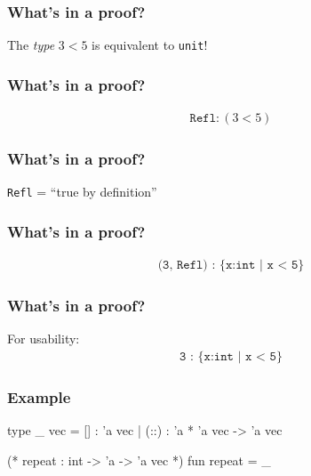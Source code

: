 \documentclass[usenames,dvipsnames]{beamer}
\begin{document}

\begin{frame}
  \frametitle{What's in a proof?}

  The \emph{type} $3<5$ is equivalent to \texttt{unit}!
\end{frame}


\begin{frame}
  \frametitle{What's in a proof?}

  \begin{align*}
    \texttt{Refl}:(3<5)
  \end{align*}
\end{frame}


\begin{frame}
  \frametitle{What's in a proof?}

  \texttt{Refl} = ``true by definition''
\end{frame}


\begin{frame}
  \frametitle{What's in a proof?}

  \phantom{For usability:}
  \begin{align*}
    \texttt{(3, Refl) : \{x:int | x < 5\}}
  \end{align*}
\end{frame}


\begin{frame}
  \frametitle{What's in a proof?}

  For usability:
  \begin{align*}
    \texttt{3 : \{x:int | x < 5\}}
  \end{align*}
\end{frame}


\begin{frame}[fragile]
  \frametitle{Example}

  \begin{code}
    type _ vec = [] : 'a vec
               | (::) : 'a * 'a vec -> 'a vec

    (* repeat : int -> 'a -> 'a vec *)
    fun repeat = _
  \end{code}
\end{frame}
\end{document}
